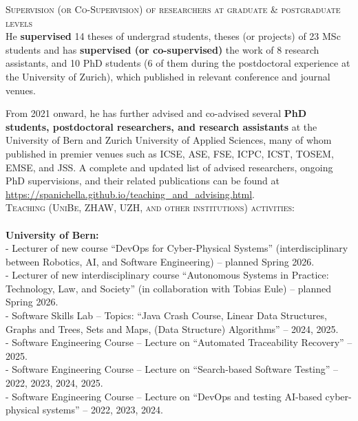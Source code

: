\documentclass[11pt]{article}
\begin{document}
 
\medskip \medskip
\textsc{Supervision (or Co-Supervision) of researchers at graduate \& postgraduate levels}
\medskip \\
He \textbf{supervised} 14 theses of undergrad students, theses (or projects) of 23 MSc students and has \textbf{supervised (or co-supervised)} the work of 8 research assistants, and 10 PhD students (6 of them during the postdoctoral experience at the University of Zurich), which published in relevant conference and journal venues. 

From 2021 onward, he has further advised and co-advised several \textbf{PhD students, postdoctoral researchers, and research assistants} at the University of Bern and Zurich University of Applied Sciences, many of whom published in premier venues such as ICSE, ASE, FSE, ICPC, ICST, TOSEM, EMSE, and JSS. A complete and updated list of advised researchers, ongoing PhD supervisions, and their related publications can be found at
\href{https://spanichella.github.io/teaching_and_advising.html}{https://spanichella.github.io/teaching\_and\_advising.html}.
\\ %

\textsc{Teaching (UniBe, ZHAW, UZH, and other institutions) activities:}
 \\
\\
\textbf{University of Bern:}
\medskip \\
- Lecturer of new course ``DevOps for Cyber-Physical Systems'' (interdisciplinary between Robotics, AI, and Software Engineering) – planned Spring 2026.\\
- Lecturer of new interdisciplinary course ``Autonomous Systems in Practice: Technology, Law, and Society'' (in collaboration with Tobias Eule) – planned Spring 2026.\\
- Software Skills Lab – Topics: ``Java Crash Course, Linear Data Structures, Graphs and Trees, Sets and Maps, (Data Structure) Algorithms'' – 2024, 2025.\\
- Software Engineering Course – Lecture on ``Automated Traceability Recovery'' – 2025.\\
- Software Engineering Course – Lecture on ``Search-based Software Testing'' – 2022, 2023, 2024, 2025.\\
- Software Engineering Course – Lecture on ``DevOps and testing AI-based cyber-physical systems'' – 2022, 2023, 2024.\\
 
\end{document}
